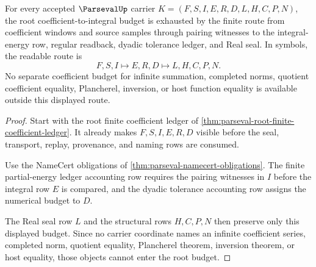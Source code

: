 \begin{theorem}
\label{thm:parseval-root-coefficient-integral-budget}
For every accepted $\ParsevalUp$ carrier $K=(F,S,I,E,R,D,L,H,C,P,N)$, the root coefficient-to-integral budget is exhausted by the finite route from coefficient windows and source samples through pairing witnesses to the integral-energy row, regular readback, dyadic tolerance ledger, and Real seal. In symbols, the readable route is
$$
F,S,I \longmapsto E,R,D \longmapsto L,H,C,P,N .
$$
No separate coefficient budget for infinite summation, completed norms, quotient coefficient equality, Plancherel, inversion, or host function equality is available outside this displayed route.
\end{theorem}
\begin{proof}
Start with the root finite coefficient ledger of \autoref{thm:parseval-root-finite-coefficient-ledger}. It already makes $F,S,I,E,R,D$ visible before the seal, transport, replay, provenance, and naming rows are consumed.

Use the NameCert obligations of \autoref{thm:parseval-namecert-obligations}. The finite partial-energy ledger accounting row requires the pairing witnesses in $I$ before the integral row $E$ is compared, and the dyadic tolerance accounting row assigns the numerical budget to $D$.

The Real seal row $L$ and the structural rows $H,C,P,N$ then preserve only this displayed budget. Since no carrier coordinate names an infinite coefficient series, completed norm, quotient equality, Plancherel theorem, inversion theorem, or host equality, those objects cannot enter the root budget.
\end{proof}

